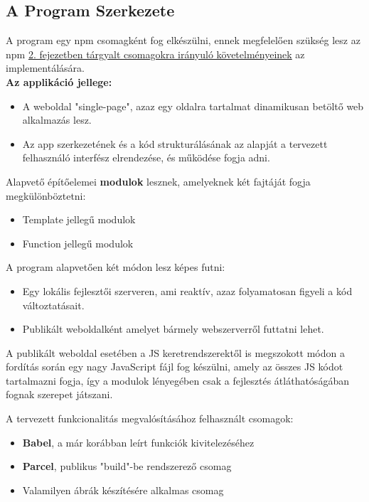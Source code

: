 \subsection{A Program Szerkezete}

A program egy npm csomagként fog elkészülni, ennek megfelelően szükség lesz az npm \hyperlink{section2.2}{2. fejezetben tárgyalt csomagokra irányuló követelményeinek} az implementálására.\\

\textbf{Az applikáció jellege:}

\begin{itemize}
	\item A weboldal "single-page", azaz egy oldalra tartalmat dinamikusan betöltő web alkalmazás lesz.
	\item Az app szerkezetének és a kód strukturálásának az alapját a tervezett felhasználó interfész elrendezése, és működése fogja adni.
\end{itemize}

\noindent Alapvető építőelemei \textbf{modulok} lesznek, amelyeknek két fajtáját fogja megkülönböztetni:

\begin{itemize}
	\item Template jellegű modulok
	\item Function jellegű modulok
\end{itemize}

\noindent A program alapvetően két módon lesz képes futni:

\begin{itemize}
	\item Egy lokális fejlesztői szerveren, ami reaktív, azaz folyamatosan figyeli a kód változtatásait.
	\item Publikált weboldalként amelyet bármely webszerverről futtatni lehet.
\end{itemize}

\noindent A publikált weboldal esetében a JS keretrendszerektől is megszokott módon a fordítás során egy nagy JavaScript fájl fog készülni, amely az összes JS kódot tartalmazni fogja, így a modulok lényegében csak a fejlesztés átláthatóságában fognak szerepet játszani.

\noindent A tervezett funkcionalitás megvalósításához felhasznált csomagok:
\begin{itemize}
	\item \textbf{Babel}, a már korábban leírt funkciók kivitelezéséhez
	\item \textbf{Parcel}, publikus "build"-be rendszerező csomag
	\item Valamilyen ábrák készítésére alkalmas csomag
\end{itemize}

